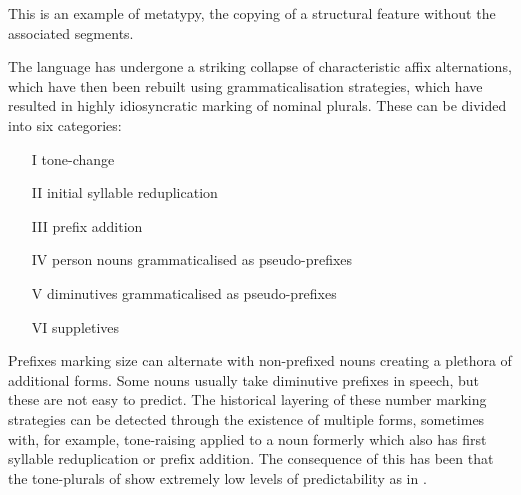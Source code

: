 \documentclass[output=paper]{langsci/langscibook}
\begin{document}
This is an example of metatypy, the copying of a structural feature without the associated segments.

The  language has undergone a striking collapse of characteristic affix alternations, which have then been rebuilt using grammaticalisation strategies, which have resulted in highly idiosyncratic marking of nominal plurals. These can be divided into six categories:

\ea
\begin{enumerate}
\item[I]    tone-change
\item[II]   initial syllable reduplication
\item[III]  prefix addition
\item[IV]   person nouns grammaticalised as pseudo-prefixes
\item[V]    diminutives grammaticalised as pseudo-prefixes
\item[VI]   suppletives
\end{enumerate}
\z

Prefixes marking size can alternate with non-prefixed nouns creating a pleth\-o\-ra of additional forms. Some nouns usually take diminutive prefixes in speech, but these are not easy to predict. The historical layering of these number marking strategies can be detected through the existence of multiple forms, sometimes with, for example, tone-raising applied to a noun formerly which also has first syllable reduplication or prefix addition. The consequence of this has been that the tone-plurals of  show extremely low levels of predictability as in . 
\end{document}
